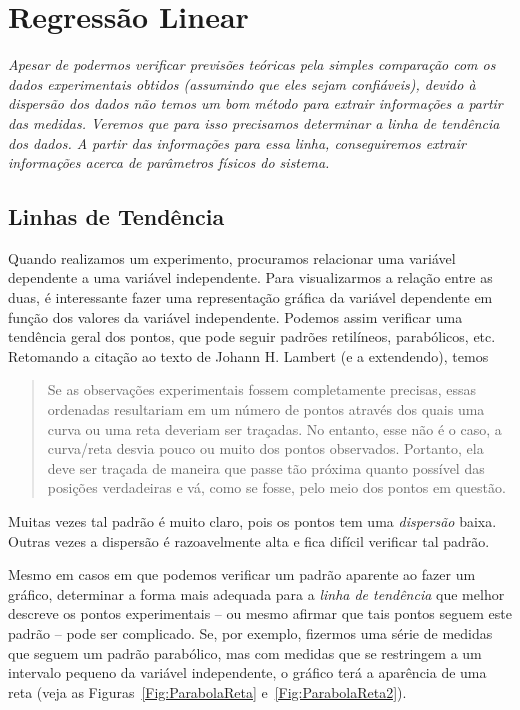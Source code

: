 \chapter{Regressão Linear}
\label{Chap:RegressoLinear}

{\it
Apesar de podermos verificar previsões teóricas pela simples comparação com os dados experimentais obtidos (assumindo que eles sejam confiáveis), devido à dispersão dos dados não temos um bom método para extrair informações a partir das medidas. Veremos que para isso precisamos determinar a linha de tendência dos dados. A partir das informações para essa linha, conseguiremos extrair informações acerca de parâmetros físicos do sistema.
}
\section{Linhas de Tendência}

Quando realizamos um experimento, procuramos relacionar uma variável dependente a uma variável independente. Para visualizarmos a relação entre as duas, é interessante fazer uma representação gráfica da variável dependente em função dos valores da variável independente. Podemos assim verificar uma tendência geral dos pontos, que pode seguir padrões retilíneos, parabólicos, etc. Retomando a citação ao texto de Johann H. Lambert (e a extendendo), temos\cite{Lambert}
\begin{quote}
Se as observações experimentais fossem completamente precisas, essas ordenadas resultariam em um número de pontos através dos quais uma curva ou uma reta deveriam ser traçadas. No entanto, esse não é o caso, a curva/reta desvia pouco ou muito dos pontos observados. Portanto, ela deve ser traçada de maneira que passe tão próxima quanto possível das posições verdadeiras e vá, como se fosse, pelo meio dos pontos em questão.
\end{quote}
%
Muitas vezes tal padrão é muito claro, pois os pontos tem uma \emph{dispersão} baixa. Outras vezes a dispersão é razoavelmente alta e fica difícil verificar tal padrão.

Mesmo em casos em que podemos verificar um padrão aparente ao fazer um gráfico, determinar a forma mais adequada para a \emph{linha de tendência} que melhor descreve os pontos experimentais -- ou mesmo afirmar que tais pontos seguem este padrão -- pode ser complicado. Se, por exemplo, fizermos uma série de medidas que seguem um padrão parabólico, mas com medidas que se restringem a um intervalo pequeno da variável independente, o gráfico terá a aparência de uma reta (veja as Figuras~\ref{Fig:ParabolaReta} e~\ref{Fig:ParabolaReta2}).
\begin{figure*}
\centering
\forceversofloat
\caption{Gráfico de um conjunto de pontos que aparentemente seguem uma tendência linear. Veja também a Figura~\ref{Fig:ParabolaReta2}.}
\label{Fig:ParabolaReta}

\end{figure*}

